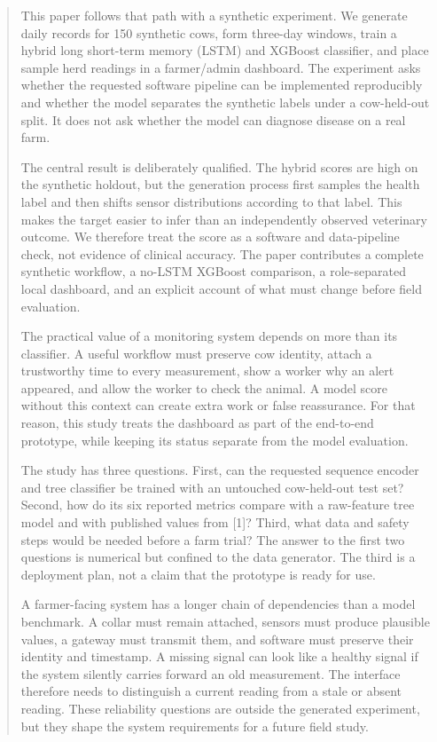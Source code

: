 \documentclass[journal]{IEEEtran}
\begin{document}
\begin{abstract}
This paper follows that path with a synthetic experiment. We generate daily records for 150 synthetic cows, form three-day windows, train a hybrid long short-term memory (LSTM) and XGBoost classifier, and place sample herd readings in a farmer/admin dashboard. The experiment asks whether the requested software pipeline can be implemented reproducibly and whether the model separates the synthetic labels under a cow-held-out split. It does not ask whether the model can diagnose disease on a real farm.

The central result is deliberately qualified. The hybrid scores are high on the synthetic holdout, but the generation process first samples the health label and then shifts sensor distributions according to that label. This makes the target easier to infer than an independently observed veterinary outcome. We therefore treat the score as a software and data-pipeline check, not evidence of clinical accuracy. The paper contributes a complete synthetic workflow, a no-LSTM XGBoost comparison, a role-separated local dashboard, and an explicit account of what must change before field evaluation.

The practical value of a monitoring system depends on more than its classifier. A useful workflow must preserve cow identity, attach a trustworthy time to every measurement, show a worker why an alert appeared, and allow the worker to check the animal. A model score without this context can create extra work or false reassurance. For that reason, this study treats the dashboard as part of the end-to-end prototype, while keeping its status separate from the model evaluation.

The study has three questions. First, can the requested sequence encoder and tree classifier be trained with an untouched cow-held-out test set? Second, how do its six reported metrics compare with a raw-feature tree model and with published values from [1]? Third, what data and safety steps would be needed before a farm trial? The answer to the first two questions is numerical but confined to the data generator. The third is a deployment plan, not a claim that the prototype is ready for use.

A farmer-facing system has a longer chain of dependencies than a model benchmark. A collar must remain attached, sensors must produce plausible values, a gateway must transmit them, and software must preserve their identity and timestamp. A missing signal can look like a healthy signal if the system silently carries forward an old measurement. The interface therefore needs to distinguish a current reading from a stale or absent reading. These reliability questions are outside the generated experiment, but they shape the system requirements for a future field study.


\end{abstract}
\end{document}
